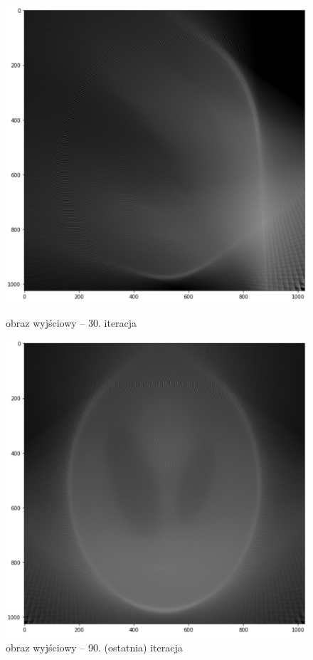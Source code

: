 \documentclass[polish,polish,a4paper]{article}
\begin{document}
				\begin{figure}[!h]
					\centering
					\begin{minipage}{0.45\linewidth}
						\includegraphics[width=\linewidth]{img/out_30.png}
						\caption{obraz wyjściowy -- 30. iteracja}
					\end{minipage}
					\hfill
					\begin{minipage}{0.45\linewidth}
						\includegraphics[width=\linewidth]{img/out_90.png}
						\caption{obraz wyjściowy -- 90. (ostatnia) iteracja}
					\end{minipage}
				\end{figure}
			
\end{document}
